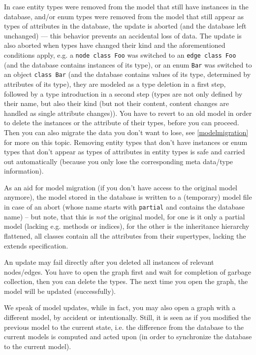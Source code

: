 In case entity types were removed from the model that still have instances in the database, and/or enum types were removed from the model that still appear as types of attributes in the database, the update is aborted (and the database left unchanged) --- this behavior prevents an accidental loss of data.
The update is also aborted when types have changed their kind and the aforementioned conditions apply, e.g. a \texttt{node class Foo} was switched to an \texttt{edge class Foo} (and the database contains instances of its type), or an enum \texttt{Bar} was switched to an object \texttt{class Bar} (and the database contains values of its type, determined by attributes of its type), they are modeled as a type deletion in a first step, followed by a type introduction in a second step (types are not only defined by their name, but also their kind (but not their content, content changes are handled as single attribute changes)).
You have to revert to an old model in order to delete the instances or the attribute of their types, before you can proceed.
Then you can also migrate the data you don't want to lose, see \ref{modelmigration} for more on this topic.
Removing entity types that don't have instances or enum types that don't appear as types of attributes in entity types is safe and carried out automatically (because you only lose the corresponding meta data/type information).

As an aid for model migration (if you don't have access to the original model anymore), the model stored in the database is written to a (temporary) model file in case of an abort (whose name starts with \texttt{partial} and contains the database name) -- but note, that this is \emph{not} the original model, for one is it only a partial model (lacking e.g. methods or indices), for the other is the inheritance hierarchy flattened, all classes contain all the attributes from their supertypes, lacking the extends specification.

\begin{warning}
An update may fail directly after you deleted all instances of relevant nodes/edges.
You have to open the graph first and wait for completion of garbage collection, then you can delete the types.
The next time you open the graph, the model will be updated (successfully).
\end{warning}

\begin{note}
We speak of model updates, while in fact, you may also open a graph with a different model, by accident or intentionally.
Still, it is seen as if you modified the previous model to the current state, i.e. the difference from the database to the current models is computed and acted upon (in order to synchronize the database to the current model).
\end{note}

